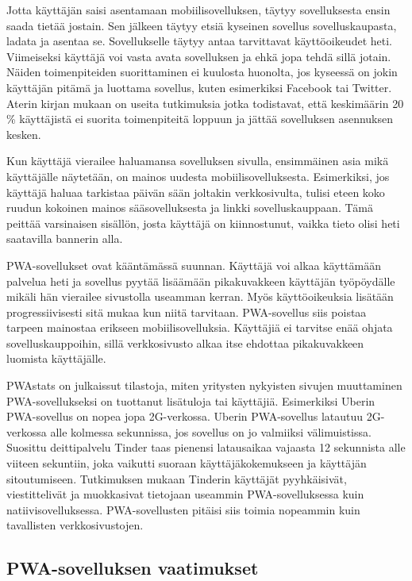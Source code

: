 \documentclass{tktltiki}
\begin{document}
Jotta käyttäjän saisi asentamaan mobiilisovelluksen, täytyy sovelluksesta ensin saada tietää jostain. Sen jälkeen täytyy etsiä kyseinen sovellus sovelluskaupasta, ladata ja asentaa se. Sovellukselle täytyy antaa tarvittavat käyttöoikeudet heti. Viimeiseksi käyttäjä voi vasta avata sovelluksen ja ehkä jopa tehdä sillä jotain. Näiden toimenpiteiden suorittaminen ei kuulosta huonolta, jos kyseessä on jokin käyttäjän pitämä ja luottama sovellus, kuten esimerkiksi Facebook tai Twitter. Aterin kirjan mukaan \cite{ater2017building} on useita tutkimuksia jotka todistavat, että keskimäärin 20 \% käyttäjistä ei suorita toimenpiteitä loppuun ja jättää sovelluksen asennuksen kesken.

Kun käyttäjä vierailee haluamansa sovelluksen sivulla, ensimmäinen asia mikä käyttäjälle näytetään, on mainos uudesta mobiilisovelluksesta. Esimerkiksi, jos käyttäjä haluaa tarkistaa päivän sään joltakin verkkosivulta, tulisi eteen koko ruudun kokoinen mainos sääsovelluksesta ja linkki sovelluskauppaan. Tämä peittää varsinaisen sisällön, josta käyttäjä on kiinnostunut, vaikka tieto olisi heti saatavilla bannerin alla. 

PWA-sovellukset ovat kääntämässä suunnan. Käyttäjä voi alkaa käyttämään palvelua heti ja sovellus pyytää lisäämään pikakuvakkeen käyttäjän työpöydälle mikäli hän vierailee sivustolla useamman kerran. Myös käyttöoikeuksia lisätään progressiivisesti sitä mukaa kun niitä tarvitaan. PWA-sovellus siis poistaa tarpeen mainostaa erikseen mobiilisovelluksia. Käyttäjiä ei tarvitse enää ohjata sovelluskauppoihin, sillä verkkosivusto alkaa itse ehdottaa pikakuvakkeen luomista käyttäjälle. 

PWAstats \cite{PWAstats} on julkaissut tilastoja, miten yritysten nykyisten sivujen muuttaminen PWA-sovellukseksi on tuottanut lisätuloja tai käyttäjiä. Esimerkiksi Uberin PWA-sovellus on nopea jopa 2G-verkossa. Uberin PWA-sovellus latautuu 2G-verkossa alle kolmessa sekunnissa, jos sovellus on jo valmiiksi välimuistissa. Suosittu deittipalvelu Tinder taas pienensi latausaikaa vajaasta 12 sekunnista alle viiteen sekuntiin, joka vaikutti suoraan käyttäjäkokemukseen ja käyttäjän sitoutumiseen. Tutkimuksen mukaan \cite{Osmani} Tinderin käyttäjät pyyhkäisivät, viestittelivät ja muokkasivat tietojaan useammin PWA-sovelluksessa kuin natiivisovelluksessa. PWA-sovellusten pitäisi siis toimia nopeammin kuin tavallisten verkkosivustojen.

\subsection{PWA-sovelluksen vaatimukset}
\end{document}
